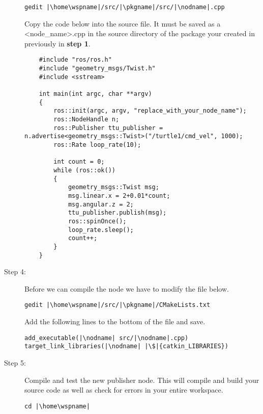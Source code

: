 \documentclass[12pt]{article}
\newcommand{\R}{\color{red}}
\newcommand{\K}{\color{black}}
\newcommand{\G}{\color{mygreen}}
\newcommand{\PR}{\color{mypurple}}
\newcommand{\pkgname}{\G<package\_name>\K}
\newcommand{\wspname}{\R<workspace\_name>\K}
\newcommand{\nodname}{\PR<node\_name>\K}
\newcommand{\home}{\textasciitilde/}
\begin{document}
\begin{description}[labelindent=1cm]
\begin{description}
	\begin{verbatim}  
gedit |\home\wspname|/src/|\pkgname|/src/|\nodname|.cpp
	\end{verbatim}
	  
	 Copy the code below into the source file. It must be saved as a \nodname.cpp in the source directory of the package your created in previously in {\bf step 1}. \vspace{1mm}
	
	 
	\begin{lstlisting}
	#include "ros/ros.h"
	#include "geometry_msgs/Twist.h"
	#include <sstream>
	
	int main(int argc, char **argv)
	{
	    ros::init(argc, argv, "replace_with_your_node_name");
	    ros::NodeHandle n;
	    ros::Publisher ttu_publisher = n.advertise<geometry_msgs::Twist>("/turtle1/cmd_vel", 1000);
	    ros::Rate loop_rate(10);
	
	    int count = 0;
	    while (ros::ok())
	    {
	        geometry_msgs::Twist msg;
	        msg.linear.x = 2+0.01*count;
	        msg.angular.z = 2;
	        ttu_publisher.publish(msg);
	        ros::spinOnce();
	        loop_rate.sleep();
	        count++;
	    }
	}
	\end{lstlisting}
	
	
	\item[Step 4:] Before we can compile the node we have to modify the file below.
	
	\begin{verbatim}  
gedit |\home\wspname|/src/|\pkgname|/CMakeLists.txt
	\end{verbatim}
	
	Add the following lines to the bottom of the file and save.
	
	\begin{verbatim}
add_executable(|\nodname| src/|\nodname|.cpp)
target_link_libraries(|\nodname| |\$|{catkin_LIBRARIES}) 
	\end{verbatim}
	\newpage
	 
	
	\item[Step 5:] Compile and test the new publisher node. This will compile and build your source code as well as check for errors in your entire workspace.
	\begin{verbatim}  
cd |\home\wspname|
	\end{verbatim}
	

\end{description}
\end{description}
\end{document}
